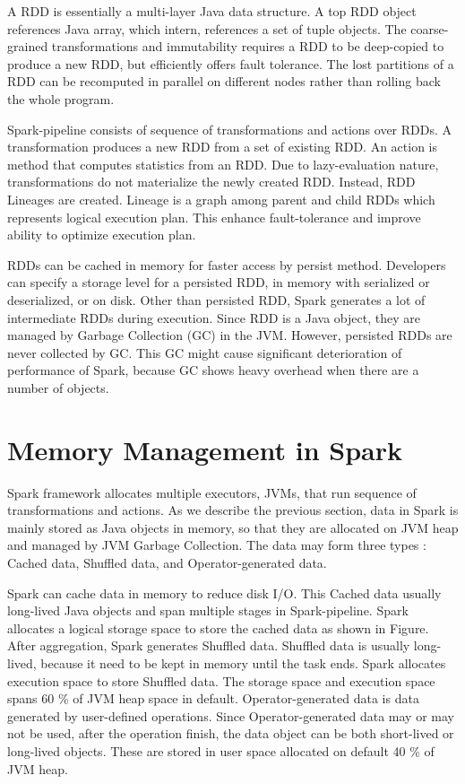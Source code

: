 A RDD is essentially a multi-layer Java data structure. A top RDD object references Java array, which intern, references a set of tuple objects. 
The coarse-grained transformations and immutability requires a RDD to be deep-copied to produce a new RDD, but efficiently offers fault tolerance. 
The lost partitions of a RDD can be recomputed in parallel on different nodes rather than rolling back the whole program.

Spark-pipeline consists of sequence of transformations and actions over RDDs. A transformation produces a new RDD from a set of existing RDD. 
An action is method that computes statistics from an RDD. Due to lazy-evaluation nature, transformations do not materialize the newly created RDD. 
Instead, RDD Lineages are created. Lineage is a graph among parent and child RDDs which represents logical execution plan. 
This enhance fault-tolerance and improve ability to optimize execution plan. 

RDDs can be cached in memory for faster access by persist method. Developers can specify a storage level for a persisted RDD, in memory with serialized or deserialized, or on disk. 
Other than persisted RDD, Spark generates a lot of intermediate RDDs during execution. Since RDD is a Java object, they are managed by Garbage Collection (GC) in the JVM. 
However, persisted RDDs are never collected by GC. This GC might cause significant deterioration of performance of Spark, because GC shows heavy overhead when there are a number of objects.


\section{Memory Management in Spark}
\label{sec:history}
Spark framework allocates multiple executors, JVMs, that run sequence of transformations and actions. As we describe the previous section, data in Spark is mainly stored as Java objects in memory, 
so that they are allocated on JVM heap and managed by JVM Garbage Collection. The data may form three types \cite{DBLP:journals/pvldb/XuGDWW19}: Cached data, Shuffled data, and Operator-generated data. 

Spark can cache data in memory to reduce disk I/O. This Cached data usually long-lived Java objects and span multiple stages in Spark-pipeline. 
Spark allocates a logical storage space to store the cached data as shown in Figure. After aggregation, Spark generates Shuffled data. Shuffled data is usually long-lived, 
because it need to be kept in memory until the task ends. Spark allocates execution space to store Shuffled data.
The storage space and execution space spans 60 \% of JVM heap space in default. Operator-generated data is data generated by user-defined operations. Since Operator-generated data may or may not be used, 
after the operation finish, the data object can be both short-lived or long-lived objects. These are stored in user space allocated on default 40 \% of JVM heap.


